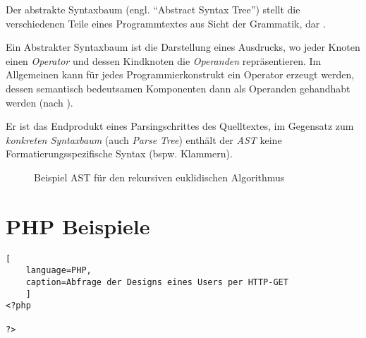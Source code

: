 \begin{thesisDefinition}
Der abstrakte Syntaxbaum (engl. \enquote{Abstract Syntax Tree}) stellt die verschiedenen Teile eines Programmtextes aus Sicht der Grammatik, dar \cite[][S. 9 ff.]{gruneCompiler}.
\end{thesisDefinition}
\begin{thesisDefinition}
Ein Abstrakter Syntaxbaum ist die Darstellung eines Ausdrucks, wo jeder Knoten einen \emph{Operator} und dessen Kindknoten die \emph{Operanden} repräsentieren.
Im Allgemeinen kann für jedes Programmierkonstrukt ein Operator erzeugt werden, dessen semantisch bedeutsamen Komponenten dann als Operanden gehandhabt werden (nach \cite[][S. 69]{ahoCompiler}).
\end{thesisDefinition}
Er ist das Endprodukt eines Parsingschrittes des Quelltextes, im Gegensatz zum \emph{konkreten Syntaxbaum} (auch \emph{Parse Tree}) enthält der \emph{AST} keine Formatierungsspezifische Syntax (bspw. Klammern). 

\begin{figure}[htb]
    \centering
        \centering
    \caption{Beispiel AST für den rekursiven euklidischen Algorithmus}
    \label{fig:ast}   
\end{figure}

\section{PHP Beispiele}

\begin{lstlisting}[
    language=PHP,
    caption=Abfrage der Designs eines Users per HTTP-GET
    ]
<?php

?>
\end{lstlisting}
